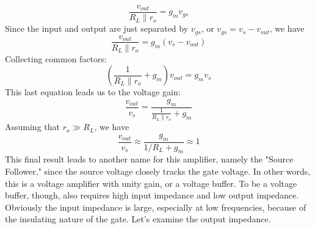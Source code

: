     \begin{equation}
        \frac{{{v_{out}}}}{{{R_L} \parallel {r_o}}} = {g_m}{v_{gs}}
    \end{equation}
Since the input and output are just separated by $v_{gs}$, or $v_{gs} = v_{s} - v_{out}$, we have
    \begin{equation}
        \frac{{{v_{out}}}}{{{R_L} \parallel {r_o}}} = {g_m}\left( {{v_{s}} - {v_{out}}} \right)
    \end{equation}
Collecting common factors:
    \begin{equation}
        \left( {\frac{1}{{{R_L} \parallel {r_o}}} + {g_m}} \right){v_{out}} = {g_m}{v_{s}}
    \end{equation}
This last equation leads us to the voltage gain:
    \begin{equation}
        \frac{{{v_{out}}}}{{{v_{s}}}} = \frac{{{g_m}}}{{\frac{1}{{{R_L} \parallel {r_o}}} + {g_m}}}
    \end{equation}
Assuming that $r_o \gg R_L$, we have
    \begin{equation}
        \frac{{{v_{out}}}}{{{v_{s}}}} \approx \frac{{{g_m}}}{{1/{R_L} + {g_m}}} \approx 1
    \end{equation}
This final result leads to another name for this amplifier, namely the "Source Follower," since the source voltage closely tracks the gate voltage.  In other words, this is a voltage amplifier with unity gain, or a voltage buffer.
To be a voltage buffer, though, also requires high input impedance and low output impedance.  Obviously the input impedance is large, especially at low frequencies, because of the insulating nature of the gate.  Let's examine the output impedance.
